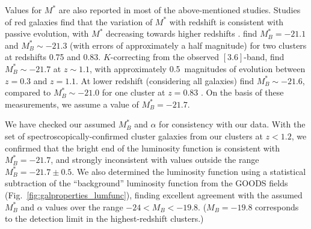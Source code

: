 Values for $M^\ast$ are also reported in most of the above-mentioned
studies. Studies of red galaxies find that the variation of $M^\ast$
with redshift is consistent with passive evolution, with $M^\ast$
decreasing towards higher
redshifts \citep{andreon06c,crawford09a}. \citet{crawford09a} find
$M^\ast_B = -21.1$ and $M^\ast_B \sim -21.3$ (with errors of
approximately a half magnitude) for two clusters at redshifts 0.75 and
0.83. $K$-correcting from the observed
$[3.6]$-band, \citet{andreon06c} find $M^\ast_B \sim -21.7$ at $z \sim
1.1$, with approximately 0.5~magnitudes of evolution between $z=0.3$
and $z=1.1$. At lower redshift (considering all
galaxies) \citet{goto02a} find $M^\ast_B \sim -21.6$, compared to
$M^\ast_B \sim -21.0$ for one cluster at $z=0.83$ \citep{goto05a}. On
the basis of these measurements, we assume a value of $M^\ast_B =
-21.7$.

We have checked our assumed $M^\ast_B$ and $\alpha$ for consistency
with our data. With the set of spectroscopically-confirmed cluster
galaxies from our clusters at $z<1.2$, we confirmed that the bright
end of the luminosity function is consistent with $M^\ast_B = -21.7$,
and strongly inconsistent with values outside the range $M^\ast_B =
-21.7 \pm 0.5$. We also determined the luminosity function using a
statistical subtraction of the ``background'' luminosity function from
the GOODS fields (Fig.~\ref{fig:galproperties_lumfunc}), finding
excellent agreement with the assumed $M^\ast_B$ and $\alpha$ values
over the range $-24 < M_B < -19.8$. ($M_B = -19.8$ corresponds to the
detection limit in the highest-redshift clusters.)

